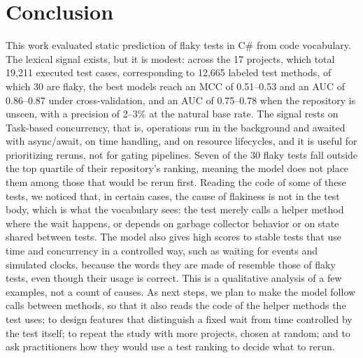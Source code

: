 \section{Conclusion}
This work evaluated static prediction of flaky tests in C\# from code vocabulary. The lexical signal exists, but it is modest: across the 17 projects, which total 19,211 executed test cases, corresponding to 12,665 labeled test methods, of which 30 are flaky, the best models reach an MCC of 0.51--0.53 and an AUC of 0.86--0.87 under cross-validation, and an AUC of 0.75--0.78 when the repository is unseen, with a precision of 2--3\% at the natural base rate. The signal rests on Task-based concurrency, that is, operations run in the background and awaited with async/await, on time handling, and on resource lifecycles, and it is useful for prioritizing reruns, not for gating pipelines. Seven of the 30 flaky tests fall outside the top quartile of their repository's ranking, meaning the model does not place them among those that would be rerun first. Reading the code of some of these tests, we noticed that, in certain cases, the cause of flakiness is not in the test body, which is what the vocabulary sees: the test merely calls a helper method where the wait happens, or depends on garbage collector behavior or on state shared between tests. The model also gives high scores to stable tests that use time and concurrency in a controlled way, such as waiting for events and simulated clocks, because the words they are made of resemble those of flaky tests, even though their usage is correct. This is a qualitative analysis of a few examples, not a count of causes. As next steps, we plan to make the model follow calls between methods, so that it also reads the code of the helper methods the test uses; to design features that distinguish a fixed wait from time controlled by the test itself; to repeat the study with more projects, chosen at random; and to ask practitioners how they would use a test ranking to decide what to rerun.